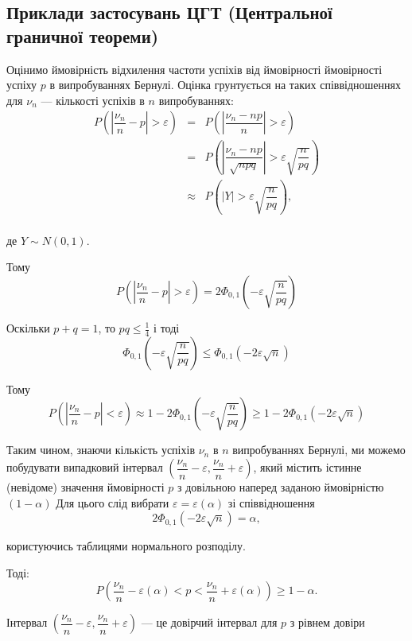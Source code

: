 \subsection{Приклади застосувань ЦГТ (Центральної граничної теореми)}

\begin{example}
    Оцінимо ймовірність відхилення
    частоти успіхів від ймовірності ймовірності успіху $p$ в
    випробуваннях Бернулі.
    Оцінка грунтується на таких співвідношеннях для
    $\nu_n$ --- кількості успіхів в $n$ випробуваннях:
    $$\begin{array}{rcl}
        P\left(\left|\dfrac{\nu_n}{n} - p\right| > \varepsilon \right)
        & = & P\left(\left| \dfrac{\nu_n -np}{n} \right| > \varepsilon \right) \\
        & = & P\left(\left| \dfrac{\nu_n -np}{\sqrt{npq}} \right| > \varepsilon \sqrt{\dfrac{n}{pq}} \right) \\
        & \approx & P\left(\left| Y \right| > \varepsilon \sqrt{\dfrac{n}{pq}} \right), \\
    \end{array}$$
    
    де $Y \sim N(0, 1)$.
    
    Тому
    $$P\left(\left|\dfrac{\nu_n}{n} - p\right| > \varepsilon \right)
    = 2 \Phi_{0, 1}(-\varepsilon \sqrt{\dfrac{n}{pq}})$$
    
    \beautifulImage
        
    Оскільки $p + q = 1$, то $pq \leqslant \frac{1}{4}$
    і тоді
    $$\Phi_{0, 1}(-\varepsilon \sqrt{\dfrac{n}{pq}}) \leqslant \Phi_{0, 1}(- 2 \varepsilon \sqrt{n})$$
    
    Тому
    $$P\left(\left|\dfrac{\nu_n}{n} - p\right| < \varepsilon \right)
    \approx 1 - 2 \Phi_{0, 1}(-\varepsilon\sqrt{\dfrac{n}{pq}})
    \geqslant 1 - 2 \Phi_{0, 1}(- 2 \varepsilon \sqrt{n})$$
    
    Таким чином, знаючи кількість успіхів $\nu_n$ в
    $n$ випробуваннях Бернулі, ми можемо побудувати
    випадковий інтервал
    $\left( \dfrac{\nu_n}{n} - \varepsilon, \dfrac{\nu_n}{n} + \varepsilon \right)$,
    який містить істинне (невідоме) значення ймовірності
    $p$ з довільною наперед заданою ймовірністю $(1 - \alpha)$
    Для цього слід вибрати $\varepsilon = \varepsilon(\alpha)$ зі
    співвідношення
    $$2 \Phi_{0, 1}(- 2 \varepsilon \sqrt{n}) = \alpha,$$

    користуючись таблицями нормального розподілу.

    Тоді:
    $$P\left( \dfrac{\nu_n}{n} - \varepsilon(\alpha) < p < \dfrac{\nu_n}{n} + \varepsilon(\alpha) \right)
    \geqslant 1 - \alpha.$$
    
    Інтервал
    $\left( \dfrac{\nu_n}{n} - \varepsilon, \dfrac{\nu_n}{n} + \varepsilon \right)$
    --- це довірчий інтервал для $p$ з рівнем довіри
\end{example}

